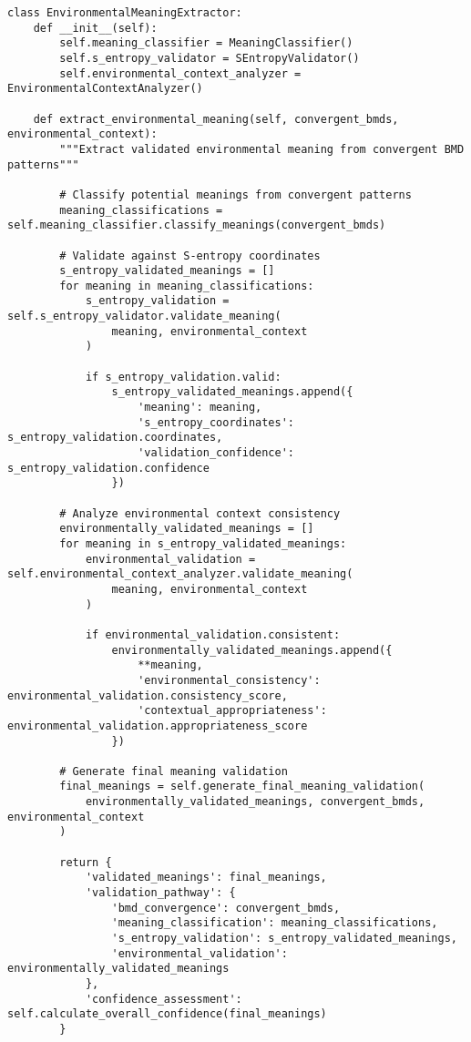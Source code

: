 \documentclass[12pt,a4paper]{article}
\begin{document}
\begin{lstlisting}[style=pythonstyle, caption=Environmental Meaning Extraction]
class EnvironmentalMeaningExtractor:
    def __init__(self):
        self.meaning_classifier = MeaningClassifier()
        self.s_entropy_validator = SEntropyValidator()
        self.environmental_context_analyzer = EnvironmentalContextAnalyzer()
        
    def extract_environmental_meaning(self, convergent_bmds, environmental_context):
        """Extract validated environmental meaning from convergent BMD patterns"""
        
        # Classify potential meanings from convergent patterns
        meaning_classifications = self.meaning_classifier.classify_meanings(convergent_bmds)
        
        # Validate against S-entropy coordinates
        s_entropy_validated_meanings = []
        for meaning in meaning_classifications:
            s_entropy_validation = self.s_entropy_validator.validate_meaning(
                meaning, environmental_context
            )
            
            if s_entropy_validation.valid:
                s_entropy_validated_meanings.append({
                    'meaning': meaning,
                    's_entropy_coordinates': s_entropy_validation.coordinates,
                    'validation_confidence': s_entropy_validation.confidence
                })
        
        # Analyze environmental context consistency
        environmentally_validated_meanings = []
        for meaning in s_entropy_validated_meanings:
            environmental_validation = self.environmental_context_analyzer.validate_meaning(
                meaning, environmental_context
            )
            
            if environmental_validation.consistent:
                environmentally_validated_meanings.append({
                    **meaning,
                    'environmental_consistency': environmental_validation.consistency_score,
                    'contextual_appropriateness': environmental_validation.appropriateness_score
                })
        
        # Generate final meaning validation
        final_meanings = self.generate_final_meaning_validation(
            environmentally_validated_meanings, convergent_bmds, environmental_context
        )
        
        return {
            'validated_meanings': final_meanings,
            'validation_pathway': {
                'bmd_convergence': convergent_bmds,
                'meaning_classification': meaning_classifications,
                's_entropy_validation': s_entropy_validated_meanings,
                'environmental_validation': environmentally_validated_meanings
            },
            'confidence_assessment': self.calculate_overall_confidence(final_meanings)
        }
    

\end{lstlisting}
\end{document}
